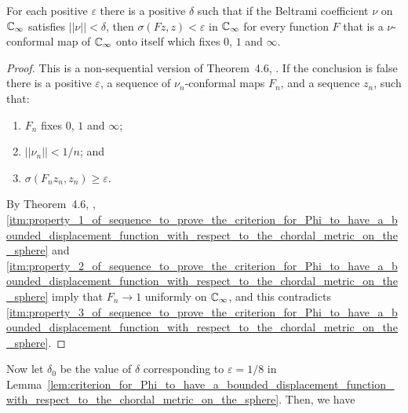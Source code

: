\begin{lemma}
    \label{lem:criterion_for_Phi_to_have_a_bounded_displacement_function_with_respect_to_the_chordal_metric_on_the_sphere}
    For each positive $\varepsilon$ there is a positive $\delta$ such that if
    the Beltrami coefficient $\nu$ on $\mathbb{C}_\infty$ satisfies $||\nu|| < \delta$, then
    $\sigma(Fz, z) < \varepsilon$ in $\mathbb{C}_\infty$ for every function $F$ that is a
    $\nu$-conformal map of $\mathbb{C}_\infty$ onto itself which fixes $0$, $1$ and
    $\infty$.
\end{lemma}
\begin{proof}
    This is a non-sequential version of Theorem~4.6, \cite{Lehto1987}. If the
    conclusion is false there is a positive $\varepsilon$, a sequence of
    $\nu_n$-conformal maps $F_n$, and a sequence $z_n$, such that:
    \begin{enumerate}[label=(\roman*)]
        \item
        \label{itm:property_1_of_sequence_to_prove_the_criterion_for_Phi_to_have_a_bounded_displacement_function_with_respect_to_the_chordal_metric_on_the_sphere}
        $F_n$ fixes $0$, $1$ and $\infty$;
        \item
        \label{itm:property_2_of_sequence_to_prove_the_criterion_for_Phi_to_have_a_bounded_displacement_function_with_respect_to_the_chordal_metric_on_the_sphere}
        $||\nu_n|| < 1/n$; and
        \item 
        \label{itm:property_3_of_sequence_to_prove_the_criterion_for_Phi_to_have_a_bounded_displacement_function_with_respect_to_the_chordal_metric_on_the_sphere}
        $\sigma(F_n z_n, z_n) \geq \varepsilon$.
    \end{enumerate}
    By Theorem~4.6, \cite{Lehto1987},
    \ref{itm:property_1_of_sequence_to_prove_the_criterion_for_Phi_to_have_a_bounded_displacement_function_with_respect_to_the_chordal_metric_on_the_sphere}
    and
    \ref{itm:property_2_of_sequence_to_prove_the_criterion_for_Phi_to_have_a_bounded_displacement_function_with_respect_to_the_chordal_metric_on_the_sphere}
    imply that $F_n \to 1$ uniformly on $\mathbb{C}_\infty$, and this contradicts
    \ref{itm:property_3_of_sequence_to_prove_the_criterion_for_Phi_to_have_a_bounded_displacement_function_with_respect_to_the_chordal_metric_on_the_sphere}.
\end{proof}

Now let $\delta_0$ be the value of $\delta$ corresponding to $\varepsilon = 1/8$
in
Lemma~\ref{lem:criterion_for_Phi_to_have_a_bounded_displacement_function_with_respect_to_the_chordal_metric_on_the_sphere}.
Then, we have

